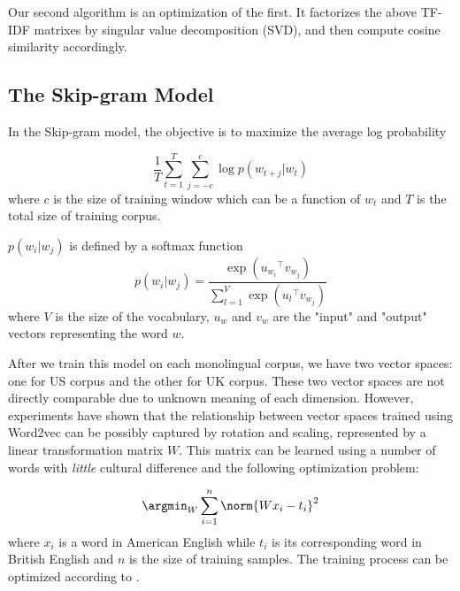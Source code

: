 Our second algorithm is an optimization of the first. It factorizes the
above TF-IDF matrixes by singular value decomposition (SVD), and then compute
cosine similarity accordingly.

\subsection{The Skip-gram Model}


In the Skip-gram model, the objective is to maximize the average 
log probability

\begin{equation*}
\frac{1}{T} \sum_{t=1}^{T} \sum_{j=-c}^{c} \log p(w_{t+j}|w_t)
\end{equation*}
where $c$ is the size of training window which can be a function of $w_t$ and 
$T$ is the total size of training corpus.

$p(w_i|w_j)$ is defined by a softmax function
\begin{equation*}
p(w_i|w_j)=\frac{\exp(u_{w_i} {}^{\top} v_{w_j})}{\sum_{l = 1}^{V} \exp(u_l {}^{\top} v_{w_j})}
\end{equation*}
where $V$ is the size of the vocabulary, $u_w$ and $v_w$ are the "input" and "output" vectors representing the word $w$.

After we train this model on each monolingual corpus, we have two vector spaces: one for US corpus and the other for UK corpus. These two vector spaces 
are not directly comparable due to unknown meaning of each dimension. 
However, experiments \cite{Mikolov:2013tp} have shown that the relationship 
between vector spaces trained using Word2vec can be possibly captured by 
rotation and scaling, represented by a linear transformation matrix $W$. 
This matrix can be learned using a number of words with {\em little} 
cultural difference and the following optimization problem:

\begin{equation*}
\argmin_{W}\sum_{i=1}^{n}\norm{Wx_{i}-t_{i}}^2
\end{equation*}
where $x_{i}$ is a word in American English while $t_{i}$ is its 
corresponding word in British English and $n$ is the size of 
training samples. 
The training process can be optimized according to 
\cite{Mikolov2013distributed}.
